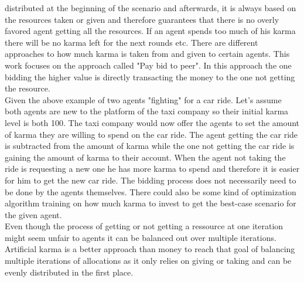 \documentclass[german, a4paper, 11pt, oneside]{scrbook}
\begin{document}
distributed at the beginning of the scenario and afterwards, it is always based on the resources taken or given and therefore guarantees that there is no overly favored agent getting all the resources. If an agent spends too much of his karma there will be no karma left for the next rounds etc.  \cite{Elokda.2023}
There are different approaches to how much karma is taken from and given to certain agents. This work focuses on the approach called "Pay bid to peer". In this approach the one bidding the higher value is directly transacting the money to the one not getting the resource. \cite{Elokda.2023} \\Given the above example of two agents "fighting" for a car ride. Let's assume both agents are new to the platform of the taxi company so their initial karma level is both 100. The taxi company would now offer the agents to set the amount of karma they are willing to spend on the car ride. The agent getting the car ride is subtracted from the amount of karma while the one not getting the car ride is gaining the amount of karma to their account. When the agent not taking the ride is requesting a new one he has more karma to spend and therefore it is easier for him to get the new car ride. The bidding process does not necessarily need to be done by the agents themselves. There could also be some kind of optimization algorithm training on how much karma to invest to get the best-case scenario for the given agent.
\\Even though the process of getting or not getting a ressource at one iteration might seem unfair to agents it can be balanced out over multiple iterations. Artificial karma is a better approach than money to reach that goal of balancing multiple iterations of allocations as it only relies on giving or taking and can be evenly distributed in the first place. \cite{Elokda.2023}
\end{document}
